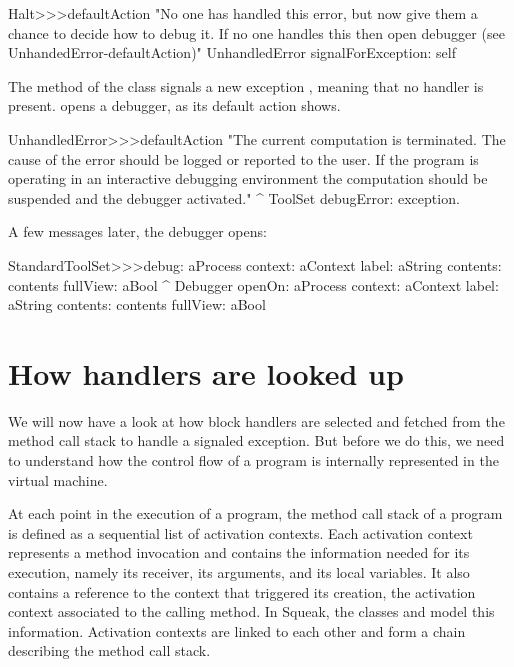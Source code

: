 \documentclass[a4paper,10pt,twoside]{book}
\begin{document}
\begin{code}{}
Halt>>>defaultAction
	"No one has handled this error, but now give them a chance to decide
	how to debug it.  If no one handles this then open debugger
	(see UnhandedError-defaultAction)"
	UnhandledError signalForException: self
\end{code}

The method   of the  class signals a new exception , meaning that no handler is present.  opens a debugger, as its default action shows.

\begin{code}{}
UnhandledError>>>defaultAction
	"The current computation is terminated. The cause of the error should be logged or reported to the user. If the program is operating in an interactive debugging environment the computation should be suspended and the debugger activated."
	^ ToolSet debugError: exception.
\end{code}

A few messages later, the debugger opens:

\begin{code}{}
StandardToolSet>>>debug: aProcess context: aContext label: aString contents: contents fullView: aBool
	^ Debugger openOn: aProcess context: aContext label: aString contents: contents fullView: aBool
\end{code}

\section{How handlers are looked up}

We will now have a look at how block handlers are selected and fetched from the method call stack to handle a signaled exception. But before we do this, we need to understand how the control flow of a program is internally represented in the virtual machine.

At each point in the execution of a program, the method call stack of a program is defined as a sequential list of activation contexts. Each activation context represents a method invocation and contains the information needed for its execution, namely its receiver, its arguments, and its local variables. It also contains a reference to the context that triggered its creation, \ie the activation context associated to the calling method. In Squeak, the classes  and  model this information. Activation contexts are linked to each other and form a chain describing the method call stack.
\end{document}
